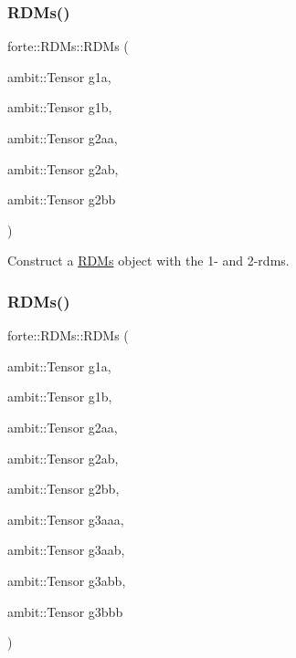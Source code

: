 \subsubsection{\texorpdfstring{R\+D\+Ms()}{RDMs()}\hspace{0.1cm}{\footnotesize\ttfamily [3/7]}}
{\footnotesize\ttfamily forte\+::\+R\+D\+Ms\+::\+R\+D\+Ms (\begin{DoxyParamCaption}\item[{ambit\+::\+Tensor}]{g1a,  }\item[{ambit\+::\+Tensor}]{g1b,  }\item[{ambit\+::\+Tensor}]{g2aa,  }\item[{ambit\+::\+Tensor}]{g2ab,  }\item[{ambit\+::\+Tensor}]{g2bb }\end{DoxyParamCaption})}



Construct a \mbox{\hyperlink{classforte_1_1_r_d_ms}{R\+D\+Ms}} object with the 1-\/ and 2-\/rdms. 

\mbox{\label{classforte_1_1_r_d_ms_a1821993fd4f7662eeed418333791263e}} 
\subsubsection{\texorpdfstring{R\+D\+Ms()}{RDMs()}\hspace{0.1cm}{\footnotesize\ttfamily [4/7]}}
{\footnotesize\ttfamily forte\+::\+R\+D\+Ms\+::\+R\+D\+Ms (\begin{DoxyParamCaption}\item[{ambit\+::\+Tensor}]{g1a,  }\item[{ambit\+::\+Tensor}]{g1b,  }\item[{ambit\+::\+Tensor}]{g2aa,  }\item[{ambit\+::\+Tensor}]{g2ab,  }\item[{ambit\+::\+Tensor}]{g2bb,  }\item[{ambit\+::\+Tensor}]{g3aaa,  }\item[{ambit\+::\+Tensor}]{g3aab,  }\item[{ambit\+::\+Tensor}]{g3abb,  }\item[{ambit\+::\+Tensor}]{g3bbb }\end{DoxyParamCaption})}



